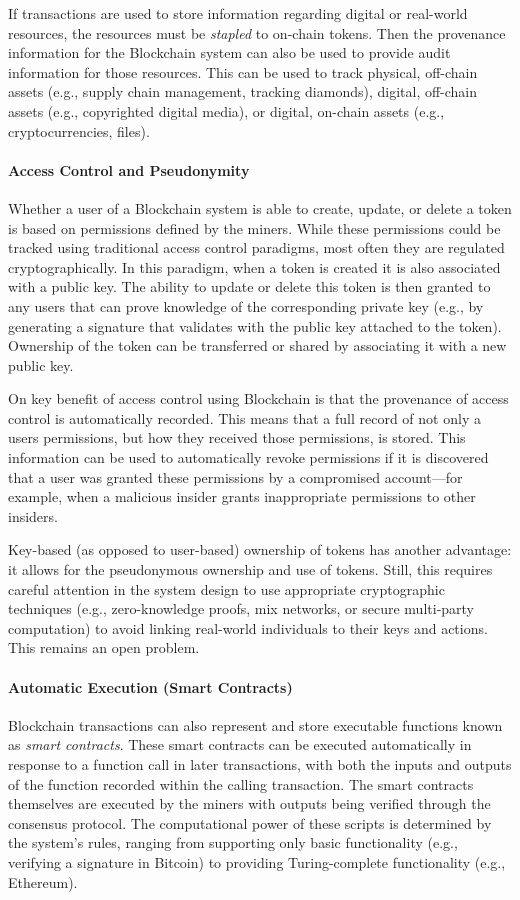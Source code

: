 If transactions are used to store information regarding digital or real-world resources, the resources must be \emph{stapled} to on-chain tokens. Then the provenance information for the Blockchain system can also be used to provide audit information for those resources.
This can be used to track physical, off-chain assets (e.g., supply chain management, tracking diamonds), digital, off-chain assets (e.g., copyrighted digital media), or digital, on-chain assets (e.g., cryptocurrencies, files).
 
\paragraph{Access Control and Pseudonymity}
Whether a user of a Blockchain system is able to create, update, or delete a token is based on permissions defined by the miners.
While these permissions could be tracked using traditional access control paradigms, most often they are regulated cryptographically.
In this paradigm, when a token is created it is also associated with a public key.
The ability to update or delete this token is then granted to any users that can prove knowledge of the corresponding private key (e.g., by generating a signature that validates with the public key attached to the token).
Ownership of the token can be transferred or shared by associating it with a new public key.

On key benefit of access control using Blockchain is that the provenance of access control is automatically recorded.
This means that a full record of not only a users permissions, but how they received those permissions, is stored.
This information can be used to automatically revoke permissions if it is discovered that a user was granted these permissions by a compromised account---for example, when a malicious insider grants inappropriate permissions to other insiders.

Key-based (as opposed to user-based) ownership of tokens has another advantage: it allows for the pseudonymous ownership and use of tokens.
Still, this requires careful attention in the system design to use appropriate cryptographic techniques (e.g., zero-knowledge proofs, mix networks, or secure multi-party computation) to avoid linking real-world individuals to their keys and actions. This remains an open problem.

\paragraph{Automatic Execution (Smart Contracts)}
Blockchain transactions can also represent and store executable functions known as \emph{smart contracts}.
These smart contracts can be executed automatically in response to a function call in later transactions, with both the inputs and outputs of the function recorded within the calling transaction.
The smart contracts themselves are executed by the miners with outputs being verified through the consensus protocol.
The computational power of these scripts is determined by the system's rules, ranging from supporting only basic functionality (e.g., verifying a signature in Bitcoin) to providing Turing-complete functionality (e.g., Ethereum).


